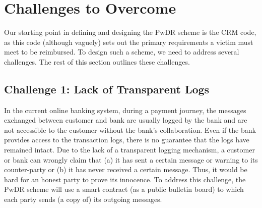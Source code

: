 
\vspace{-2.5mm}
\section{Challenges to Overcome}\label{sec:: challenges}


Our starting point in defining and  designing the PwDR scheme is the CRM code, as this code (although vaguely) sets out the primary requirements a victim must meet to be reimbursed.  To design such a scheme, we need to address  several challenges. The rest of this section  outlines these challenges. 




\vspace{-2.5mm}
\subsection{Challenge 1: Lack of Transparent Logs} 
In the current online  banking system, during a payment journey, the messages exchanged between customer and bank are usually logged by the bank and are not accessible to the customer without the bank's collaboration. Even if the bank provides access to the transaction logs, there is no guarantee that the logs have remained intact. Due to the lack of a transparent logging mechanism, a customer or bank can wrongly claim that (a) it has sent a certain message or warning to its counter-party or (b) it has never  received a certain message.  Thus, it would be hard for an honest party  to prove its innocence. To address this challenge, the PwDR scheme will use a  smart contract (as a public bulletin board) to which  each party sends (a copy of) its outgoing messages. %



